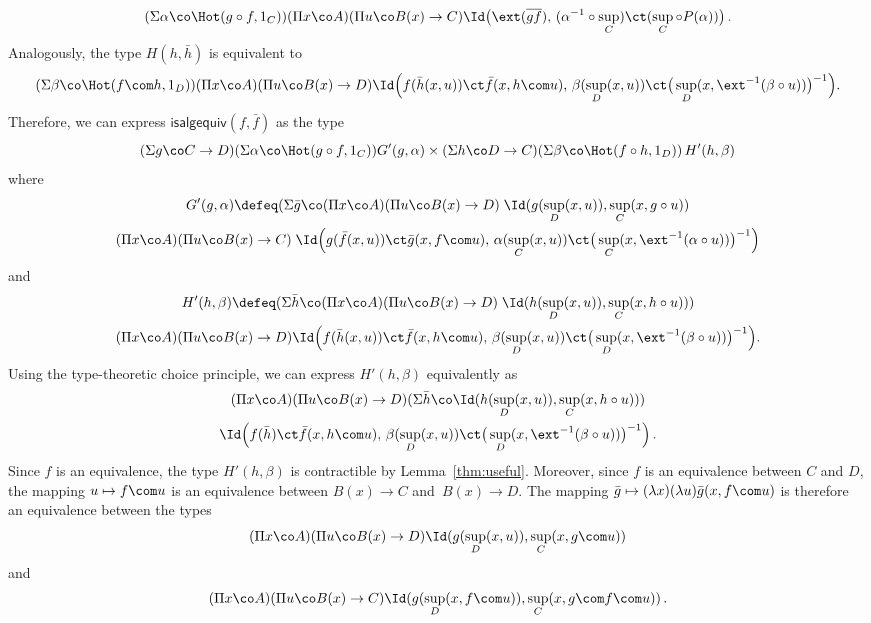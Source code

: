 \[
(\Sigma \alpha \co \Hot( g \circ f, 1{_C}))
(\Pi x \co A) 
(\Pi u \co B(x) \to C) 
	\Id\big( \ext( \overline{gf}) , \,  (\alpha^{-1} \circ \sup_C ) \ct ( \sup_{C} \circ P(\alpha) ) \big) \, .
\]
Analogously, the type $H(h,\bar{h})$ is equivalent to
\[
(\Sigma \beta \co \Hot( f \com h , 1_D))
(\Pi x \co A) 
(\Pi u \co B(x) \to D) 
\Id \Big(f(\bar{h}(x,u)) \ct \bar{f}(x, h \com u),\, \beta(\sup_D(x,u)) \ct \big(\sup_D(x,\ext^{-1}(\beta \circ u))\big)^{-1}\Big).
\]
Therefore, we can express $\mathsf{isalgequiv}(f,\bar{f})$ as the type
\[ 
(\Sigma g \co C\to D) 
(\Sigma \alpha \co \Hot(g \circ f, 1_C)) G'(g,\alpha) \times
(\Sigma h \co D\to C) 
(\Sigma \beta \co \Hot(f \circ h , 1_D)) \, 
	  H'(h,\beta)
	\]
where
\begin{multline*}
G'(g,\alpha) \defeq 
(\Sigma \bar{g} \co 
(\Pi x \co A) 
(\Pi u \co B(x) \to D) \;
\Id(g(\sup_D(x,u)), \sup_C(x,g \circ u)) \\
(\Pi x \co A) 
(\Pi u \co B(x) \to C) \;
		 \Id\Big(g(\bar{f}(x,u)) \ct \bar{g}(x, f \com u),\, \alpha(\sup_C(x,u)) \ct \big(\sup_C(x,\ext^{-1}(\alpha \circ u))\big)^{-1}\Big) 
		\end{multline*}
		and
\begin{multline*}
H'(h,\beta) \defeq 
(\Sigma \bar{h} \co (\Pi x \co A) (\Pi u \co B(x) \to D) \; \Id(h(\sup_D(x,u)), \sup_C(x,h\circ u))) \\
	 (\Pi x \co A) (\Pi u \co B(x) \to D) 
	 		\Id\Big(f(\bar{h}(x,u)) \ct \bar{f}(x, h \com u),\, \beta(\sup_D(x,u)) \ct \big(\sup_D(x,\ext^{-1}(\beta \circ u))\big)^{-1}\Big).
\end{multline*}
Using the type-theoretic choice principle, we can express $H'(h,\beta)$ equivalently as
\begin{multline*}
(\Pi x \co A) 
(\Pi u \co B(x) \to D) 
(\Sigma \bar{h} \co \Id(h(\sup_D(x,u)), \sup_C(x,h \circ u)))  \\ 
\Id\Big(f(\bar{h}) \ct \bar{f}(x, h \com u) ,\, \beta(\sup_D(x,u)) \ct \big(\sup_D(x,\ext^{-1}(\beta \circ u))\big)^{-1}\Big) \, .
\end{multline*} 
Since $f$ is an equivalence,  the type $H'(h,\beta)$ is contractible by Lemma~\ref{thm:useful}.
Moreover, since $f$ is an equivalence between $C$ and $D$, the mapping $u  \mapsto f \com u$ is an equivalence between $B(x) \to C$ and~$B(x) \to D$. The mapping 
$\bar{g} \mapsto (\lambda x) (\lambda u) \bar{g}(x,f \com u)$ is therefore an equivalence between the types 
\[
(\Pi x \co A) 
(\Pi u \co B(x) \to  D) 
\Id(g(\sup_D(x,u)), \sup_C(x,g \com u))
\] and
\[
(\Pi x \co A) 
(\Pi u \co B(x) \to C)
 \Id(g(\sup_D(x,f \com u)), \sup_C(x,g \com f \com u) )\, .
 \] 

